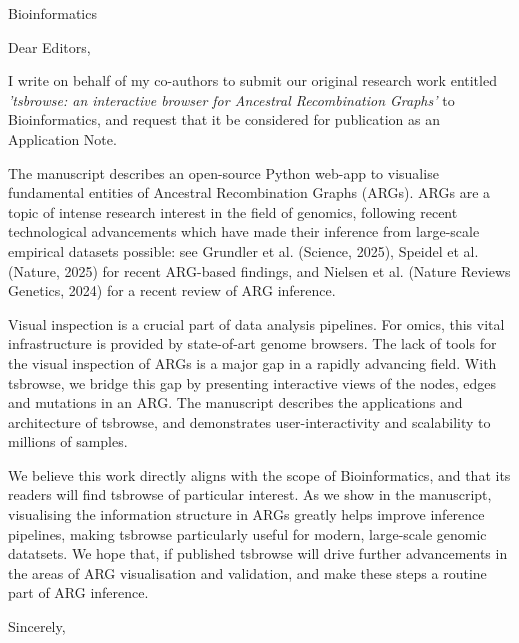 \documentclass{letter}
\begin{document}
\begin{letter}{Bioinformatics}

    \opening{Dear Editors,}

    I write on behalf of my co-authors to submit our original research work
    entitled
    \emph{'tsbrowse: an interactive browser for Ancestral Recombination
        Graphs'} to
    Bioinformatics,
    and request that it be considered for publication as an Application Note.

    The manuscript describes an open-source Python web-app to visualise
    fundamental
    entities
    of Ancestral Recombination Graphs (ARGs). ARGs are a topic of intense
    research
    interest in the field of genomics, following recent technological
    advancements
    which have made their inference from large-scale empirical datasets
    possible: see Grundler et al. (Science, 2025), Speidel et al. (Nature,
    2025)
    for recent ARG-based findings, and Nielsen et al. (Nature Reviews Genetics,
    2024) for a recent review of ARG inference.
    
    Visual inspection is a crucial part of data analysis pipelines. For omics,
    this
    vital
    infrastructure is provided by state-of-art genome browsers. The lack of
    tools
    for the
    visual inspection of ARGs is a major gap in a rapidly advancing field. With
    tsbrowse,
    we bridge this gap by presenting interactive views of the nodes,
    edges
    and mutations
    in an ARG. The manuscript describes the applications and architecture of
    tsbrowse, and
    demonstrates user-interactivity and scalability to millions of samples.

    We believe this work directly aligns with the scope of Bioinformatics, and
    that
    its
    readers will find tsbrowse of particular interest. As we show in the
    manuscript, visualising
    the information structure in ARGs greatly helps improve inference
    pipelines,
    making tsbrowse
    particularly useful for modern, large-scale genomic datatsets. We hope
    that, if
    published
    tsbrowse will drive further advancements in the areas of ARG visualisation
    and
    validation,
    and make these steps a routine part of ARG inference.

    \closing{Sincerely,}

\end{letter}
\end{document}
